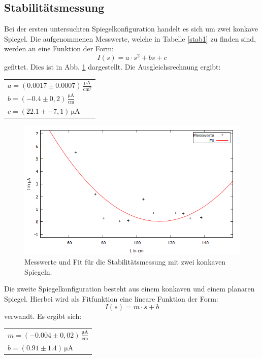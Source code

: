 \subsection{Stabilitätsmessung}
Bei der ersten untersuchten Spiegelkonfiguration handelt es sich um zwei konkave Spiegel. Die aufgenommenen Messwerte, welche in Tabelle \ref{stab1} zu finden sind,
werden an eine Funktion der Form:
\begin{equation}
  I(s)=a\cdot s^2+bs+c
\end{equation}
gefittet. Dies ist in Abb. \ref{stabfit1} dargestellt. Die Ausgleichsrechnung ergibt:
\begin{table}[H]
  \centering
\begin{tabular}{l}
 $a=(0.0017 \pm 0.0007)\, \frac{\si{\micro\ampere}}{\si{\centi\meter}^2}$\\
 $b=(-0.4 \pm 0,2)\,  \frac{\si{\micro\ampere}}{\si{\centi\meter}}$   \\
  $c=(22.1+- 7,1)\,  \si{\micro\ampere}$   \\
\end{tabular}
\end{table}
\begin{figure}[H]
  \centering
  \includegraphics[width=14cm]{bilder/konkavkonkav.png}
  \caption{Messwerte und Fit für die Stabilitätsmessung mit zwei konkaven Spiegeln.}
  \label{stabfit1}
\end{figure}
Die zweite Spiegelkonfiguration besteht aus einem konkaven und einem planaren Spiegel. Hierbei wird als Fitfunktion eine lineare Funktion der Form:
\begin{equation}
  I(s)=m\cdot s+b
\end{equation}
verwandt. Es ergibt sich:
\begin{table}
  \centering
\begin{tabular}{l}
  $m=(-0.004 \pm 0,02)\,  \frac{\si{\micro\ampere}}{\si{\centi\meter}}$   \\
 $b=(0.91 \pm 1.4)\,\si{\micro\ampere}$\\
\end{tabular}
\end{table}
